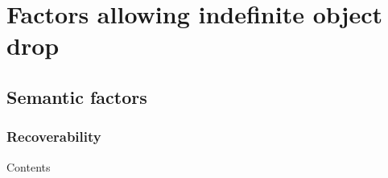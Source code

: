 \setchapterpreamble[u]{\margintoc}
\chapter{Factors allowing indefinite object drop}

\section{Semantic factors} 

\subsection{Recoverability} 

Contents


